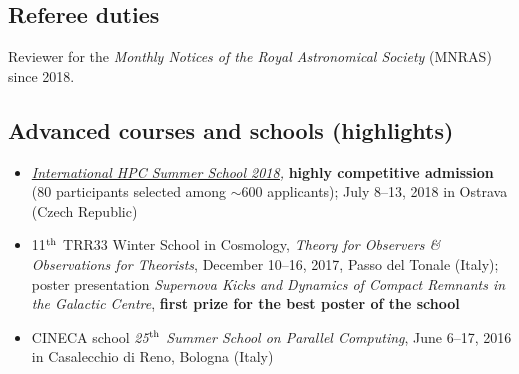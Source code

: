\subsection*{Referee duties}
Reviewer for the {\it Monthly Notices of the Royal Astronomical Society} (MNRAS) since 2018.

\subsection*{Advanced courses and schools (highlights)}

\begin{itemize}

    \item \href{http://ihpcss18.it4i.cz/}{\textit{International HPC Summer School 2018,}} {\bf highly competitive admission} (80 participants selected among $\sim$600 applicants); July 8--13, 2018 in Ostrava (Czech Republic)

    
    \item 11$^{\rm th}$ TRR33 Winter School in Cosmology, {\it Theory for Observers \& Observations for Theorists}, December 10--16, 2017, Passo del Tonale (Italy); { poster presentation} {\it Supernova Kicks and Dynamics of Compact Remnants in the Galactic Centre}, \textbf{  first prize for the best poster of the school} 
    
    

    \item CINECA school \textit{{ 25$^{\rm th}$ Summer School on Parallel Computing}}, June 6--17, 2016 in Casalecchio di Reno, Bologna (Italy)

    
    
\end{itemize}

